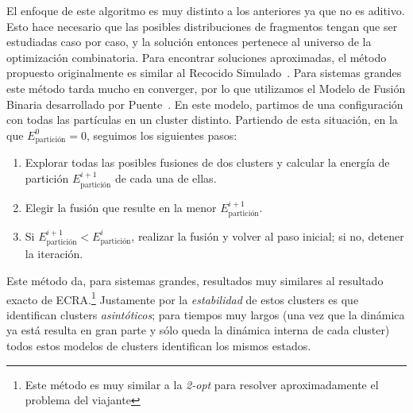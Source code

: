 El enfoque de este algoritmo es muy distinto a los anteriores ya que no es aditivo.
Esto hace necesario que las posibles distribuciones de fragmentos tengan que ser estudiadas caso por caso, y la solución entonces pertenece al universo de la optimización combinatoria.
Para encontrar soluciones aproximadas, el método propuesto originalmente es similar al Recocido Simulado~\cite{dorso_early_1993}.
Para sistemas grandes este método tarda mucho en converger, por lo que utilizamos el Modelo de Fusión Binaria desarrollado por Puente~\cite{puente_efficient_1999}.
En este modelo, partimos de una configuración con todas las partículas en un cluster distinto.
Partiendo de esta situación, en la que $E_{\text{partición}}^0 = 0$, seguimos los siguientes pasos:
\begin{enumerate}
\item Explorar todas las posibles fusiones de dos clusters y calcular la energía de partición $E_{\text{partición}}^{i+1}$ de cada una de ellas.
\item Elegir la fusión que resulte en la menor $E_{\text{partición}}^{i+1}$.
\item Si $E_{\text{partición}}^{i+1} < E_{\text{partición}}^i$, realizar la fusión y volver al paso inicial; si no, detener la iteración.
\end{enumerate}

Este método da, para sistemas grandes, resultados muy similares al resultado exacto de ECRA.\footnote{Este método es muy similar a la \emph{2-opt} para resolver aproximadamente el problema del viajante}
Justamente por la \emph{estabilidad} de estos clusters es que identifican clusters \emph{asintóticos}; para tiempos muy largos (una vez que la dinámica ya está resulta en gran parte y sólo queda la dinámica interna de cada cluster) todos estos modelos de clusters identifican los mismos estados.